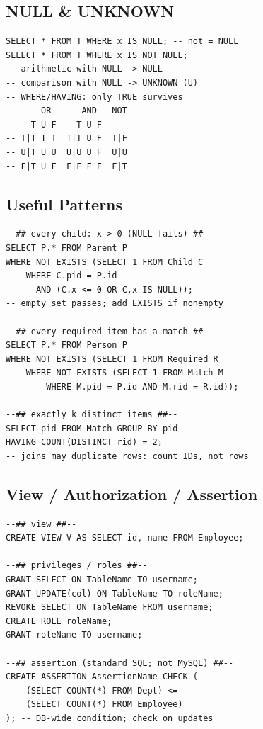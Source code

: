 \subsection*{NULL \& UNKNOWN}
\begin{verbatim}
SELECT * FROM T WHERE x IS NULL; -- not = NULL
SELECT * FROM T WHERE x IS NOT NULL;
-- arithmetic with NULL -> NULL
-- comparison with NULL -> UNKNOWN (U)
-- WHERE/HAVING: only TRUE survives
--     OR      AND   NOT
--   T U F    T U F   
-- T|T T T  T|T U F  T|F
-- U|T U U  U|U U F  U|U
-- F|T U F  F|F F F  F|T
\end{verbatim}

\subsection*{Useful Patterns}
\begin{verbatim}
--## every child: x > 0 (NULL fails) ##--
SELECT P.* FROM Parent P
WHERE NOT EXISTS (SELECT 1 FROM Child C
    WHERE C.pid = P.id
      AND (C.x <= 0 OR C.x IS NULL));
-- empty set passes; add EXISTS if nonempty

--## every required item has a match ##--
SELECT P.* FROM Person P
WHERE NOT EXISTS (SELECT 1 FROM Required R
    WHERE NOT EXISTS (SELECT 1 FROM Match M
        WHERE M.pid = P.id AND M.rid = R.id));

--## exactly k distinct items ##--
SELECT pid FROM Match GROUP BY pid
HAVING COUNT(DISTINCT rid) = 2;
-- joins may duplicate rows: count IDs, not rows
\end{verbatim}

\subsection*{View / Authorization / Assertion}
\begin{verbatim}
--## view ##--
CREATE VIEW V AS SELECT id, name FROM Employee;

--## privileges / roles ##--
GRANT SELECT ON TableName TO username;
GRANT UPDATE(col) ON TableName TO roleName;
REVOKE SELECT ON TableName FROM username;
CREATE ROLE roleName;
GRANT roleName TO username;

--## assertion (standard SQL; not MySQL) ##--
CREATE ASSERTION AssertionName CHECK (
    (SELECT COUNT(*) FROM Dept) <=
    (SELECT COUNT(*) FROM Employee)
); -- DB-wide condition; check on updates
\end{verbatim}
\endgroup
